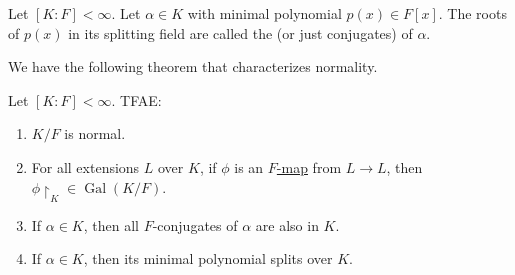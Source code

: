 \documentclass[notoc,notitlepage]{tufte-book}
\DeclareMathOperator{\Gal}{Gal}
\begin{document}
\begin{defn}[$F$-conjugates]\label{defn:_f_conjugates}
  Let $[ K : F ] < \infty$. Let $\alpha \in K$ with minimal polynomial $p(x) \in
  F[x]$. The roots of $p(x)$ in its splitting field are called the
   (or just conjugates) of $\alpha$.
\end{defn}

We have the following theorem that characterizes normality.

\begin{thm}\label{thm:normality_theorem}
  Let $[ K : F ] < \infty$. TFAE:
  \begin{enumerate}
    \item $K / F$ is normal.
    \item For all extensions $L$ over $K$, if $\phi$ is an
      \hyperref[defn:_f_map]{$F$-map} from $L \to L$, then $\phi \restriction_K
      \in \Gal(K / F)$.
    \item If $\alpha \in K$, then all $F$-conjugates of $\alpha$ are also in
      $K$.
    \item If $\alpha \in K$, then its minimal polynomial splits over $K$.
  \end{enumerate}
\end{thm}
\end{document}
